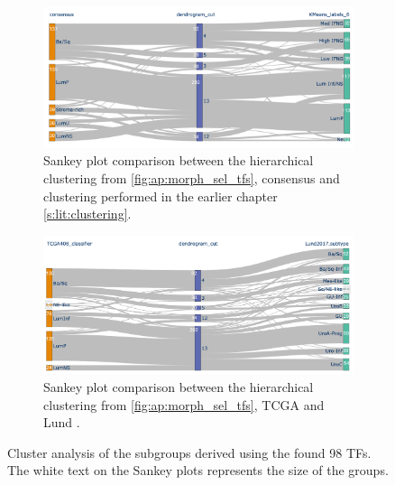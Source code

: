 \begin{figure}[!t]
\centering
    \centering
    \begin{subfigure}[!t]{1.0\textwidth}
        \includegraphics[width=1.0\textwidth,keepaspectratio]{Sections/Network_I/Resources/selective_pruning/sel_tfs/sankey_sel_tfs_VU_CS.png}
        \caption{Sankey plot comparison between the hierarchical clustering from \cref{fig:ap:morph_sel_tfs}, consensus \cite{Kamoun2020-tj} and clustering performed in the earlier chapter \cref{s:lit:clustering}.}
        \label{fig:N_I:sankey_sel_tfs_vuCs}
    \end{subfigure}
    \begin{subfigure}[!t]{1.0\textwidth}
        \includegraphics[width=1.0\textwidth,keepaspectratio]{Sections/Network_I/Resources/selective_pruning/sel_tfs/sankey_sel_tfs.png}
        \caption{Sankey plot comparison between the hierarchical clustering from \cref{fig:ap:morph_sel_tfs}, TCGA \cite{Robertson2017-mg} and Lund \cite{Marzouka2018-ge}.}
        \label{fig:N_I:sankey_sel_tfs}
    \end{subfigure}
    \centering
    \caption{Cluster analysis of the subgroups derived using the found 98 TFs. The white text on the Sankey plots represents the size of the groups.}
    \label{fig:N_I:sel_tfs_cs_analysis}
\end{figure}

